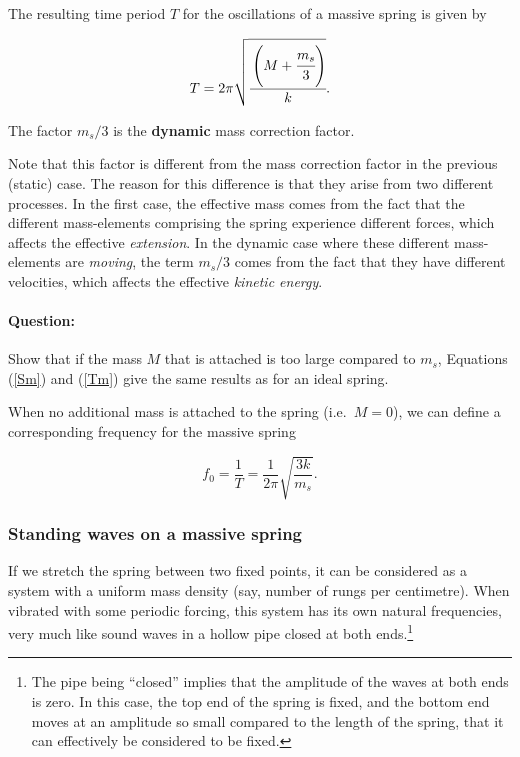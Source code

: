 The resulting time period $T$ for the oscillations of a massive spring is given by 

\begin{equation}
T = 2\pi \sqrt{\cfrac{\left(M + \cfrac{m_s}{3}\right)}{k}}.
\label{Tm}
\end{equation}

The factor $m_s/3$ is the \textbf{dynamic} mass correction factor. 

\begin{imp}
Note that this factor is different from the mass correction factor in the previous (static) case. The reason for this difference is that they arise from two different processes. In the first case, the effective mass comes from the fact that the different mass-elements comprising the spring experience different forces, which affects the effective \textit{extension}. In the dynamic case where these different mass-elements are \textit{moving}, the term $m_s/3$ comes from the fact that they have different velocities, which affects the effective \textit{kinetic energy}.

\end{imp}

\begin{question}
\paragraph{Question:} Show that if the mass $M$ that is attached is too large compared to $m_s$, Equations (\ref{Sm}) and (\ref{Tm}) give the same results as for an ideal spring. 
\end{question}


When no additional mass is attached to the spring (i.e.\ $M=0$), we can define a corresponding frequency for the massive spring  

\begin{equation}
    f_0 = \frac{1}{T} = \frac{1}{2\pi} \sqrt{\frac{3k}{m_s}}.
\end{equation}


\subsubsection*{Standing waves on a massive spring}

If we stretch the spring between two fixed points, it can be considered as a system with a uniform mass density (say, number of rungs per centimetre). When vibrated with some periodic forcing, this system has its own natural frequencies, very much like sound waves in a hollow pipe closed at both ends.\footnote{The pipe being ``closed'' implies that the amplitude of the waves at both ends is zero. In this case, the top end of the spring is fixed, and the bottom end moves at an amplitude so small compared to the length of the spring, that it can effectively be considered to be fixed.}

